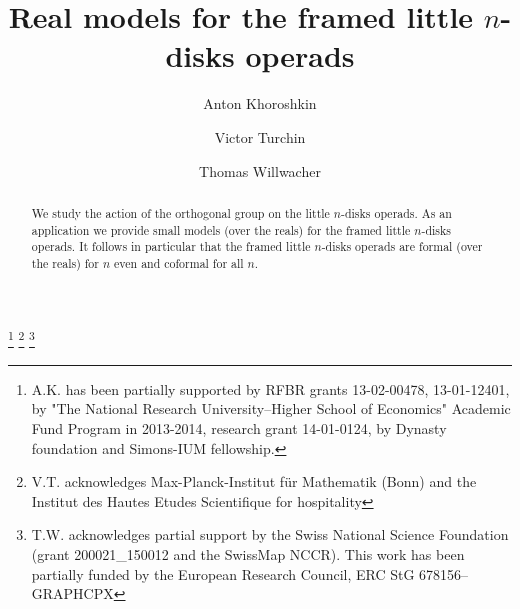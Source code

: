 \documentclass[a4paper]{amsart}
\theoremstyle{plain}
\theoremstyle{definition}
\begin{document}
\title{Real models for the framed little $n$-disks operads}


\author{Anton Khoroshkin}
\address{Faculty of mathematics\\ National University Higher School of Economics,\\ 
7 Vavilova street, Moscow, Russia, 115280}

\author{Victor Turchin}
\address{Department of Mathematics\\
  Kansas State University\\
  138 Cardwell Hall\\
  Manhatan, KS 66506, USA}
\author{Thomas Willwacher}
\address{Department of Mathematics \\ ETH Zurich \\  
R\"amistrasse 101 \\
8092 Zurich, Switzerland}



\thanks{A.K. has been partially supported by RFBR grants 13-02-00478, 13-01-12401, 
by "The National Research University--Higher School of Economics" Academic Fund Program in 2013-2014,
research grant 14-01-0124, by Dynasty foundation and Simons-IUM fellowship.}
\thanks{V.T. acknowledges Max-Planck-Institut f\"ur Mathematik  (Bonn) and the Institut des Hautes Etudes Scientifique for hospitality}
\thanks{T.W. acknowledges partial support by the Swiss National Science Foundation (grant 200021\_150012 and the SwissMap NCCR). This work has been partially funded by the European Research Council, ERC StG 678156--GRAPHCPX}



\begin{abstract}
We study the action of the orthogonal group on the little $n$-disks operads.
As an application we provide small models (over the reals) for the framed little $n$-disks operads.
It follows in particular that the framed little $n$-disks operads are formal (over the reals) for $n$ even and coformal for all $n$.
\end{abstract}
\end{document}
